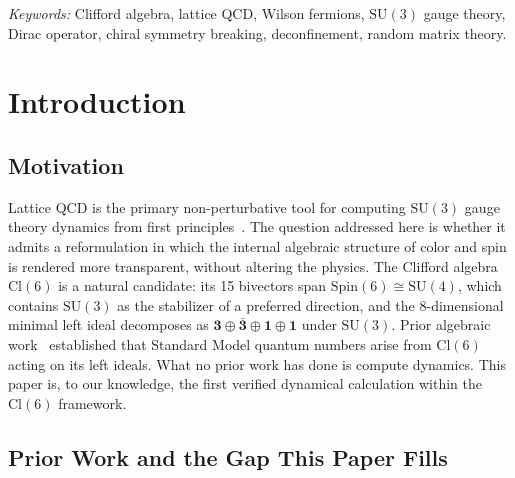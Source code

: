 \documentclass[12pt]{article}
\newcommand{\cl}{\mathrm{Cl}}          %
\newcommand{\spin}{\mathrm{Spin}}
\newcommand{\su}{\mathrm{SU}}
\begin{document}
\bigskip
\noindent\textit{Keywords:} Clifford algebra, lattice QCD, Wilson fermions,
$\su(3)$ gauge theory, Dirac operator, chiral symmetry breaking,
deconfinement, random matrix theory.

\section{Introduction}
\label{sec:intro}

\subsection{Motivation}
\label{sec:motivation}

Lattice QCD is the primary non-perturbative tool for computing
$\su(3)$ gauge theory dynamics from first principles~\cite{Wilson1974,
Kogut1975}.  The question addressed here is whether it admits a
reformulation in which the internal algebraic structure of color and
spin is rendered more transparent, without altering the physics.  The
Clifford algebra $\cl(6)$ is a natural candidate: its 15 bivectors span
$\spin(6)\cong\su(4)$, which contains $\su(3)$ as the stabilizer of a
preferred direction, and the 8-dimensional minimal left ideal decomposes
as $\mathbf{3}\oplus\bar{\mathbf{3}}\oplus\mathbf{1}\oplus\mathbf{1}$
under $\su(3)$.  Prior algebraic work~\cite{Furey2012,Furey2014,
Furey2015,Furey2018a,Furey2018b} established that Standard Model
quantum numbers arise from $\cl(6)$ acting on its left ideals.  What
no prior work has done is compute dynamics.  This paper is, to our
knowledge, the first verified dynamical calculation within the $\cl(6)$
framework.

\subsection{Prior Work and the Gap This Paper Fills}
\label{sec:priorwork}
\end{document}
